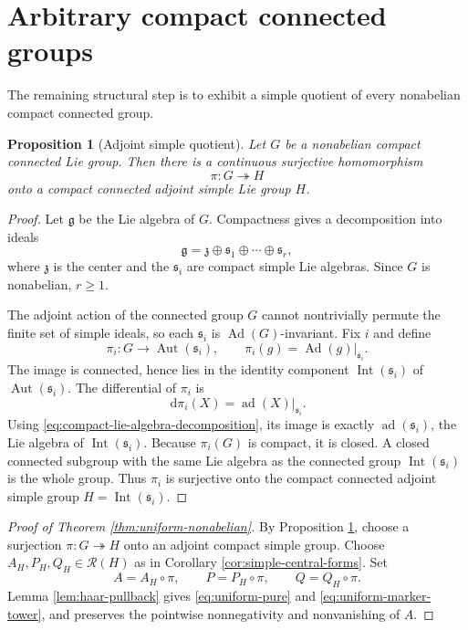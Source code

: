 \documentclass[11pt]{article}
\numberwithin{equation}{section}
\newtheorem{proposition}[theorem]{Proposition}
\newcommand{\cR}{\mathcal R}
\newcommand{\Int}{\operatorname{Int}}
\newcommand{\Aut}{\operatorname{Aut}}
\newcommand{\Ad}{\operatorname{Ad}}
\newcommand{\ad}{\operatorname{ad}}
\newcommand{\dd}{\,\mathrm d}
\begin{document}
\section{Arbitrary compact connected groups}

The remaining structural step is to exhibit a simple quotient of every
nonabelian compact connected group.

\begin{proposition}[Adjoint simple quotient]\label{prop:adjoint-simple-quotient}
Let $G$ be a nonabelian compact connected Lie group.  Then there is a
continuous surjective homomorphism
\[
 \pi:G\twoheadrightarrow H
\]
onto a compact connected adjoint simple Lie group $H$.
\end{proposition}

\begin{proof}
Let $\mathfrak g$ be the Lie algebra of $G$.  Compactness gives a decomposition
into ideals
\begin{equation}\label{eq:compact-lie-algebra-decomposition}
 \mathfrak g=\mathfrak z\oplus\mathfrak s_1\oplus\cdots\oplus\mathfrak s_r,
\end{equation}
where $\mathfrak z$ is the center and the $\mathfrak s_i$ are compact simple
Lie algebras.  Since $G$ is nonabelian, $r\geq1$.

The adjoint action of the connected group $G$ cannot nontrivially permute the
finite set of simple ideals, so each $\mathfrak s_i$ is $\Ad(G)$-invariant.
Fix $i$ and define
\[
 \pi_i:G\longrightarrow\Aut(\mathfrak s_i),
 \qquad
 \pi_i(g)=\Ad(g)|_{\mathfrak s_i}.
\]
The image is connected, hence lies in the identity component
$\Int(\mathfrak s_i)$ of $\Aut(\mathfrak s_i)$.  The differential of $\pi_i$
is
\[
 \dd\pi_i(X)=\ad(X)|_{\mathfrak s_i}.
\]
Using \eqref{eq:compact-lie-algebra-decomposition}, its image is exactly
$\ad(\mathfrak s_i)$, the Lie algebra of $\Int(\mathfrak s_i)$.  Because
$\pi_i(G)$ is compact, it is closed.  A closed connected subgroup with the
same Lie algebra as the connected group $\Int(\mathfrak s_i)$ is the whole
group.  Thus $\pi_i$ is surjective onto the compact connected adjoint simple
group $H=\Int(\mathfrak s_i)$.
\end{proof}

\begin{proof}[Proof of Theorem \ref{thm:uniform-nonabelian}]
By Proposition \ref{prop:adjoint-simple-quotient}, choose a surjection
$\pi:G\twoheadrightarrow H$ onto an adjoint compact simple group.  Choose
$A_H,P_H,Q_H\in\cR(H)$ as in Corollary
\ref{cor:simple-central-forms}.  Set
\[
 A=A_H\circ\pi,
 \qquad
 P=P_H\circ\pi,
 \qquad
 Q=Q_H\circ\pi.
\]
Lemma \ref{lem:haar-pullback} gives \eqref{eq:uniform-pure} and
\eqref{eq:uniform-marker-tower}, and preserves the pointwise nonnegativity and
nonvanishing of $A$.
\end{proof}
\end{document}
